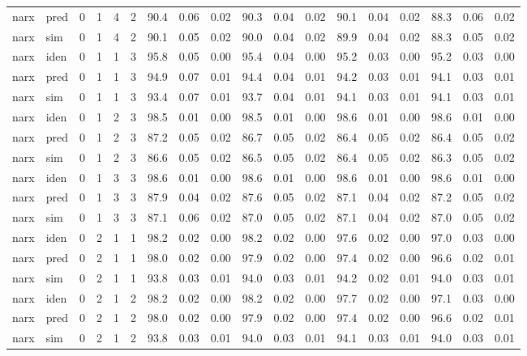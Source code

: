 \begin{landscape}
\begin{center}
\begin{longtable}{ll|cccc|ccc|ccc|ccc|ccc}
narx & pred & 0 & 1 & 4 & 2 & 90.4 & 0.06 & 0.02 & 90.3 & 0.04 & 0.02 & 90.1 & 0.04 & 0.02 & 88.3 & 0.06 & 0.02 \\ 
narx & sim  & 0 & 1 & 4 & 2 & 90.1 & 0.05 & 0.02 & 90.0 & 0.04 & 0.02 & 89.9 & 0.04 & 0.02 & 88.3 & 0.05 & 0.02 \\ 
 \hline 
narx & iden & 0 & 1 & 1 & 3 & 95.8 & 0.05 & 0.00 & 95.4 & 0.04 & 0.00 & 95.2 & 0.03 & 0.00 & 95.2 & 0.03 & 0.00 \\ 
narx & pred & 0 & 1 & 1 & 3 & 94.9 & 0.07 & 0.01 & 94.4 & 0.04 & 0.01 & 94.2 & 0.03 & 0.01 & 94.1 & 0.03 & 0.01 \\ 
narx & sim  & 0 & 1 & 1 & 3 & 93.4 & 0.07 & 0.01 & 93.7 & 0.04 & 0.01 & 94.1 & 0.03 & 0.01 & 94.1 & 0.03 & 0.01 \\ 
 \hline 
narx & iden & 0 & 1 & 2 & 3 & 98.5 & 0.01 & 0.00 & 98.5 & 0.01 & 0.00 & 98.6 & 0.01 & 0.00 & 98.6 & 0.01 & 0.00 \\ 
narx & pred & 0 & 1 & 2 & 3 & 87.2 & 0.05 & 0.02 & 86.7 & 0.05 & 0.02 & 86.4 & 0.05 & 0.02 & 86.4 & 0.05 & 0.02 \\ 
narx & sim  & 0 & 1 & 2 & 3 & 86.6 & 0.05 & 0.02 & 86.5 & 0.05 & 0.02 & 86.4 & 0.05 & 0.02 & 86.3 & 0.05 & 0.02 \\ 
 \hline 
narx & iden & 0 & 1 & 3 & 3 & 98.6 & 0.01 & 0.00 & 98.6 & 0.01 & 0.00 & 98.6 & 0.01 & 0.00 & 98.6 & 0.01 & 0.00 \\ 
narx & pred & 0 & 1 & 3 & 3 & 87.9 & 0.04 & 0.02 & 87.6 & 0.05 & 0.02 & 87.1 & 0.04 & 0.02 & 87.2 & 0.05 & 0.02 \\ 
narx & sim  & 0 & 1 & 3 & 3 & 87.1 & 0.06 & 0.02 & 87.0 & 0.05 & 0.02 & 87.1 & 0.04 & 0.02 & 87.0 & 0.05 & 0.02 \\ 
 \hline 
narx & iden & 0 & 2 & 1 & 1 & 98.2 & 0.02 & 0.00 & 98.2 & 0.02 & 0.00 & 97.6 & 0.02 & 0.00 & 97.0 & 0.03 & 0.00 \\ 
narx & pred & 0 & 2 & 1 & 1 & 98.0 & 0.02 & 0.00 & 97.9 & 0.02 & 0.00 & 97.4 & 0.02 & 0.00 & 96.6 & 0.02 & 0.01 \\ 
narx & sim  & 0 & 2 & 1 & 1 & 93.8 & 0.03 & 0.01 & 94.0 & 0.03 & 0.01 & 94.2 & 0.02 & 0.01 & 94.0 & 0.03 & 0.01 \\ 
 \hline 
narx & iden & 0 & 2 & 1 & 2 & 98.2 & 0.02 & 0.00 & 98.2 & 0.02 & 0.00 & 97.7 & 0.02 & 0.00 & 97.1 & 0.03 & 0.00 \\ 
narx & pred & 0 & 2 & 1 & 2 & 98.0 & 0.02 & 0.00 & 97.9 & 0.02 & 0.00 & 97.4 & 0.02 & 0.00 & 96.6 & 0.02 & 0.01 \\ 
narx & sim  & 0 & 2 & 1 & 2 & 93.8 & 0.03 & 0.01 & 94.0 & 0.03 & 0.01 & 94.1 & 0.03 & 0.01 & 94.0 & 0.03 & 0.01 \\ 

\end{longtable}
\end{center}
\end{landscape}
